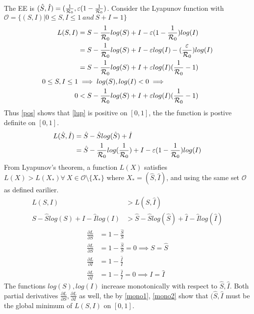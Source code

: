 The EE is $(\hat{S},\hat{I}) = (\frac{1}{{\mathcal R_0}},\varepsilon(1-\frac{1}{{\mathcal R_0}})$.
Consider the Lyapunov function with ${\mathcal O} = \{(S,I) | 0\leq S,I \leq 1\ and\ S+I = 1\} $
\begin{align}
    L(S,I) &= S - \frac{1}{{\mathcal R_0}}log(S) + I - \varepsilon(1-\frac{1}{{\mathcal R_0}})log(I)\nonumber\\
           &= S - \frac{1}{{\mathcal R_0}}log(S) + I - \varepsilon log(I) -(\frac{\varepsilon}{{\mathcal R_0}})log(I)\nonumber\\
           &= S - \frac{1}{{\mathcal R_0}}log(S) + I + \varepsilon log(I) (\frac{1}{{\mathcal R_0}}-1)\label{lup}\\
    0 \leq S,I \leq 1 &\implies log(S), log(I) < 0 \implies \nonumber\\
    0   &< S - \frac{1}{{\mathcal R_0}}log(S) + I + \varepsilon log(I) (\frac{1}{{\mathcal R_0}}-1)\label{pos}
\end{align}
Thus \ref{pos} shows that \ref{lup} is positive on $[0,1]$, the the function is postive definite on $[0,1]$.
\begin{align}
    L(\hat{S},\hat{I})  &= \hat{S} - \hat{S}log(\hat{S}) + \hat{I}\\
    &= \hat{S} - \frac{1}{{\mathcal R_0}}log(\frac{1}{{\mathcal R_0}}) + I - \varepsilon(1-\frac{1}{{\mathcal R_0}})log(I)\label{lupeq}\\
\end{align}
From Lyapunov's theorem, a function $L(X)$ satisfies $L(X) > L(X_*) \forall\ X \in {\mathcal O} \setminus \{X_*\}$ where $X_* = (\hat{S},\hat{I})$, and using the same set ${\mathcal O}$ as defined earilier.
\begin{align}
    L(S,I) &> L(\hat{S},\hat{I})\nonumber\\
    S - \hat{S}log(S) +I - \hat{I}log(I) &> \hat{S} - \hat{S}log(\hat{S}) +\hat{I} - \hat{I}log(\hat{I})\nonumber
\end{align}
\begin{align}
    \frac{\partial L}{\partial S} &= 1 - \frac{\hat{S}}{S}\nonumber\\
    \frac{\partial L}{\partial S} &= 1 - \frac{\hat{S}}{S} = 0 \implies S = \hat{S}\nonumber\\
    \frac{\partial L}{\partial I} &= 1 - \frac{\hat{I}}{I}\nonumber\\
    \frac{\partial L}{\partial I} &= 1 - \frac{\hat{I}}{I} = 0 \implies I = \hat{I}\nonumber
\end{align}
The functions $log(S), log(I)$ increase monotonically with respect to $\hat{S},\hat{I}$. Both partial derivatives $\frac{\partial L}{\partial S}, \frac{\partial L}{\partial I}$ as well, the by \ref{mono1}, \ref{mono2} show that $(\hat{S},\hat{I}$ must be the global minimum of $L(S,I)$ on $[0,1]$.\\
